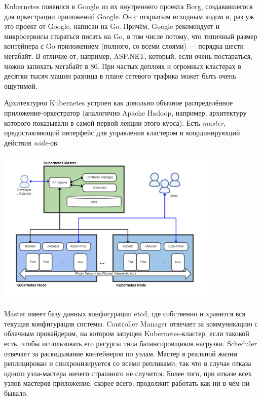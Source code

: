 \documentclass{../text-style}
\begin{document}
Kubernetes появился в Google из их внутреннего проекта Borg, создававшегося для оркестрации приложений Google. Он с открытым исходным кодом и, раз уж это проект от Google, написан на Go. Причём, Google рекомендует и микросервисы стараться писать на Go, в том числе потому, что типичный размер контейнера с Go-приложением (полного, со всеми слоями) --- порядка шести мегабайт. В отличие от, например, ASP.NET, который, если очень постараться, можно запихать мегабайт в 80. При частых деплоях и огромных кластерах в десятки тысяч машин разница в плане сетевого трафика может быть очень ощутимой.

Архитектурно Kubernetes устроен как довольно обычное распределённое приложение-оркестратор (аналогично Apache Hadoop, например, архитектуру которого показывали в самой первой лекции этого курса). Есть \emph{master}, предоставляющий интерфейс для управления кластером и координирующий действия \emph{node}-ов:

\begin{center}
    \includegraphics[width=0.8\textwidth]{kubernetesArchitecture.png}
\end{center}

Master имеет базу данных конфигурации etcd, где собственно и хранится вся текущая конфигурация системы. Controller Manager отвечает за коммуникацию с облачным провайдером, на котором запущен Kubernetes-кластер, если таковой есть, чтобы использовать его ресурсы типа балансировщиков нагрузки. Scheduler отвечает за раскидывание контейнеров по узлам. Мастер в реальной жизни реплицирован и синхронизируется со всеми репликами, так что в случае отказа одного узла-мастера ничего страшного не случится. Более того, при отказе всех узлов-мастеров приложение, скорее всего, продолжит работать как ни в чём ни бывало.
\end{document}
